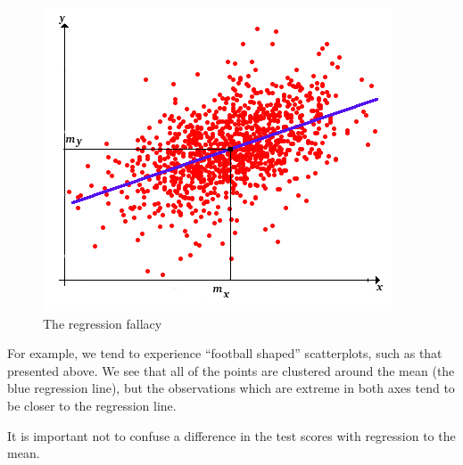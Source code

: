 \begin{figure}[H]
\begin{center}
\includegraphics[scale=0.4]{reg_fallacy.png}
\end{center}
\caption{The regression fallacy}
\label{fig:fallacy}
\end{figure}

For example, we tend to experience ``football shaped'' scatterplots, such as that presented above. We see that all of the points are clustered around the mean (the blue regression line), but the observations which are extreme in both axes tend to be closer to the regression line.

It is important not to confuse a difference in the test scores with regression to the mean.






